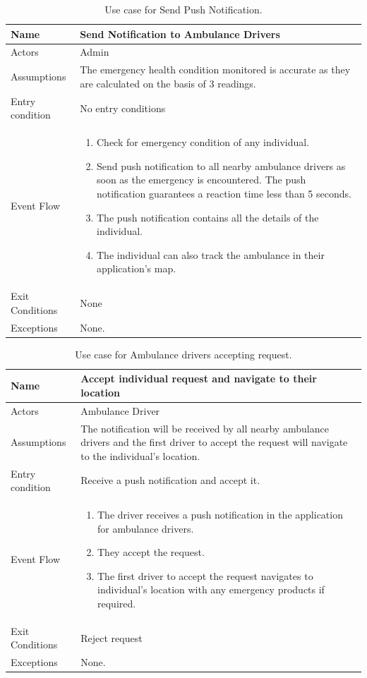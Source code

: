 \begin{table}[H]
\begin{tabular}{| l | p{} |}
\hline
Name & Send Notification to Ambulance Drivers\\
\hline
Actors & Admin\\
\hline
Assumptions & The emergency health condition monitored is accurate as they are calculated on the basis of 3 readings.
\\
\hline
Entry condition & No entry conditions\\
\hline
Event Flow & \begin{enumerate}
\item Check for emergency condition of any individual.
\item Send push notification to all nearby ambulance drivers as soon as the emergency is encountered. The push notification guarantees a reaction time less than 5 seconds.
\item The push notification contains all the details of the individual.
\item The individual can also track the ambulance in their application's map.
\end{enumerate}
\\
\hline
Exit Conditions & None\\
\hline
Exceptions & None. \\
\hline
\end{tabular}
\caption{Use case for Send Push Notification.}
\label{usecase-push-notification}
\end{table}
\begin{table}[H]
\begin{tabular}{| l | p{} |}
\hline
Name & Accept individual request and navigate to their location\\
\hline
Actors & Ambulance Driver\\
\hline
Assumptions &  The notification will be received by all nearby ambulance drivers and the first driver to accept the request will navigate to the individual's location.
\\
\hline
Entry condition & Receive a push notification and accept it.\\
\hline
Event Flow & \begin{enumerate}
\item The driver receives a push notification in the application for ambulance drivers.
\item They accept the request.
\item The first driver to accept the request navigates to individual's location with any emergency products if required.
\end{enumerate}
\\
\hline
Exit Conditions & Reject request\\
\hline
Exceptions & None. \\
\hline
\end{tabular}
\caption{Use case for Ambulance drivers accepting request.}
\label{usecase-ambulance-driver}
\end{table}
